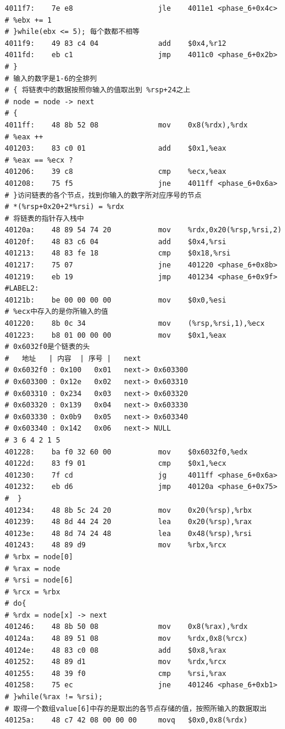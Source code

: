 \begin{verbatim}
4011f7:    7e e8                    jle    4011e1 <phase_6+0x4c>
# %ebx += 1
# }while(ebx <= 5); 每个数都不相等
4011f9:    49 83 c4 04              add    $0x4,%r12
4011fd:    eb c1                    jmp    4011c0 <phase_6+0x2b>
# } 
# 输入的数字是1-6的全排列
# { 将链表中的数据按照你输入的值取出到 %rsp+24之上
# node = node -> next
# {
4011ff:    48 8b 52 08              mov    0x8(%rdx),%rdx
# %eax ++
401203:    83 c0 01                 add    $0x1,%eax
# %eax == %ecx ?
401206:    39 c8                    cmp    %ecx,%eax
401208:    75 f5                    jne    4011ff <phase_6+0x6a>
# }访问链表的各个节点，找到你输入的数字所对应序号的节点
# *(%rsp+0x20+2*%rsi) = %rdx
# 将链表的指针存入栈中
40120a:    48 89 54 74 20           mov    %rdx,0x20(%rsp,%rsi,2)
40120f:    48 83 c6 04              add    $0x4,%rsi
401213:    48 83 fe 18              cmp    $0x18,%rsi
401217:    75 07                    jne    401220 <phase_6+0x8b>
401219:    eb 19                    jmp    401234 <phase_6+0x9f>
#LABEL2:
40121b:    be 00 00 00 00           mov    $0x0,%esi
# %ecx中存入的是你所输入的值
401220:    8b 0c 34                 mov    (%rsp,%rsi,1),%ecx
401223:    b8 01 00 00 00           mov    $0x1,%eax
# 0x6032f0是个链表的头
#   地址   | 内容  | 序号 |   next  
# 0x6032f0 : 0x100   0x01   next-> 0x603300
# 0x603300 : 0x12e   0x02   next-> 0x603310
# 0x603310 : 0x234   0x03   next-> 0x603320
# 0x603320 : 0x139   0x04   next-> 0x603330
# 0x603330 : 0x0b9   0x05   next-> 0x603340
# 0x603340 : 0x142   0x06   next-> NULL
# 3 6 4 2 1 5
401228:    ba f0 32 60 00           mov    $0x6032f0,%edx
40122d:    83 f9 01                 cmp    $0x1,%ecx
401230:    7f cd                    jg     4011ff <phase_6+0x6a>
401232:    eb d6                    jmp    40120a <phase_6+0x75>
#  }
401234:    48 8b 5c 24 20           mov    0x20(%rsp),%rbx
401239:    48 8d 44 24 20           lea    0x20(%rsp),%rax
40123e:    48 8d 74 24 48           lea    0x48(%rsp),%rsi
401243:    48 89 d9                 mov    %rbx,%rcx
# %rbx = node[0]
# %rax = node
# %rsi = node[6]
# %rcx = %rbx
# do{
# %rdx = node[x] -> next
401246:    48 8b 50 08              mov    0x8(%rax),%rdx
40124a:    48 89 51 08              mov    %rdx,0x8(%rcx)
40124e:    48 83 c0 08              add    $0x8,%rax
401252:    48 89 d1                 mov    %rdx,%rcx
401255:    48 39 f0                 cmp    %rsi,%rax
401258:    75 ec                    jne    401246 <phase_6+0xb1>
# }while(%rax != %rsi);
# 取得一个数组value[6]中存的是取出的各节点存储的值，按照所输入的数据取出
40125a:    48 c7 42 08 00 00 00     movq   $0x0,0x8(%rdx)

\end{verbatim}
